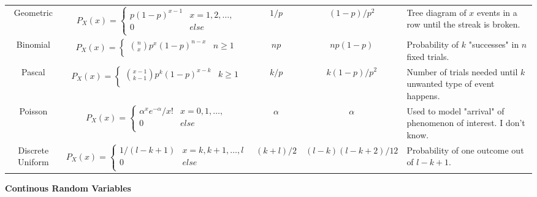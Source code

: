 \documentclass[8pt]{article}
\begin{document}
\begin{itemize}
\begin{tabular}{|c|c|c|c|p{4cm}|}
        Geometric & $P_X(x) = \begin{cases}
            p (1 - p)^{x - 1} & x = 1, 2, \ldots, \\
            0 & else \\
        \end{cases}$ & $1/p$ & $(1 - p)/p^2$ & Tree diagram of $x$ events in a row until the streak is broken.\\
        Binomial & $P_X(x) = \begin{cases}
            {n \choose x} p^x (1 - p)^{n - x} & n \geq 1 \\
        \end{cases}$ & $np$ & $np(1 - p)$ & Probability of $k$ "successes" in $n$ fixed trials.\\
        Pascal & $P_X(x) = \begin{cases}
            {x - 1 \choose k - 1} p^k (1 - p)^{x - k} & k \geq 1 \\
        \end{cases}$ & $k/p$ & $k(1 - p)/p^2$ & Number of trials needed until $k$ unwanted type of event happens.\\
        Poisson & $P_X(x) = \begin{cases}
            \alpha^x e^{-\alpha}/x! & x = 0, 1, \ldots, \\
            0 & else \\
        \end{cases}$ & $\alpha$ & $\alpha$ & Used to model "arrival" of phenomenon of interest. I don't know.\\
        Discrete Uniform & $P_X(x) = \begin{cases}
            1/(l - k + 1) & x  = k, k + 1, \ldots, l \\
            0 & else \\
        \end{cases}$ & $(k + l)/2$ & $(l - k)(l - k + 2)/12$ & Probability of one outcome out of $l - k + 1$.\\
        \hline
    \end{tabular}
\end{itemize}
\textbf{Continous Random Variables}
\end{document}
